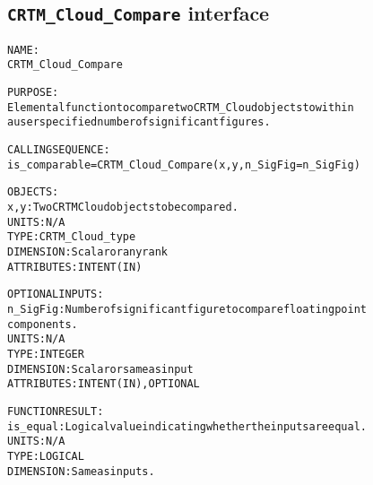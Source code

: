 \subsection{\texttt{CRTM\_Cloud\_Compare} interface}
  \label{sec:CRTM_Cloud_Compare_interface}
  \begin{alltt}
  NAME:
        CRTM_Cloud_Compare
 
  PURPOSE:
        Elemental function to compare two CRTM_Cloud objects to within
        a user specified number of significant figures.
 
  CALLING SEQUENCE:
        is_comparable = CRTM_Cloud_Compare( x, y, n_SigFig=n_SigFig )
 
  OBJECTS:
        x, y:          Two CRTM Cloud objects to be compared.
                       UNITS:      N/A
                       TYPE:       CRTM_Cloud_type
                       DIMENSION:  Scalar or any rank
                       ATTRIBUTES: INTENT(IN)
 
  OPTIONAL INPUTS:
        n_SigFig:      Number of significant figure to compare floating point
                       components.
                       UNITS:      N/A
                       TYPE:       INTEGER
                       DIMENSION:  Scalar or same as input
                       ATTRIBUTES: INTENT(IN), OPTIONAL
 
  FUNCTION RESULT:
        is_equal:      Logical value indicating whether the inputs are equal.
                       UNITS:      N/A
                       TYPE:       LOGICAL
                       DIMENSION:  Same as inputs.
  \end{alltt}
